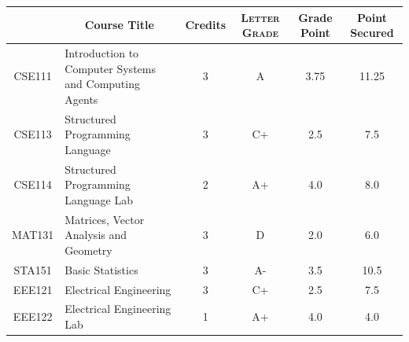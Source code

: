 \documentclass[11pt]{article}
\newcommand*{\numtwo}[1]{\pgfmathprintnumber[
                    fixed, precision=2, fixed zerofill=true]{#1}}
\begin{document}
                \begin{center}
                    \renewcommand{\arraystretch}{1.08}
                    
                \begin{tabular}{|c|l|c|>{\scshape}c|c|c|}
                \hline  \rule[-1ex]{0pt}{3.5ex} {\centering{\bf Course Code}} &  \multicolumn{1}{c|}{\textbf{Course Title}}  & {\bf Credits} & {\bf Letter Grade} & {\bf Grade Point} & {\bf Point Secured}  \\ 
                \hline   CSE111 &  Introduction to Computer Systems and Computing Agents		 & 3 & A & 3.75 & 11.25 \\ %
                \hline   CSE113 &  Structured Programming Language		 & 3 & C+ & 2.5 & 7.5 \\ %
                \hline   CSE114 &  Structured Programming Language Lab		 & 2 & A+ & 4.0 & 8.0 \\ %
                \hline   MAT131 &  Matrices, Vector Analysis and Geometry		 & 3 & D & 2.0 & 6.0 \\ %
                \hline   STA151 &  Basic Statistics		 & 3 & A- & 3.5 & 10.5 \\ %
                \hline   EEE121 &  Electrical Engineering		 & 3 & C+ & 2.5 & 7.5 \\ %
                \hline   EEE122 &  Electrical Engineering Lab		 & 1 & A+ & 4.0 & 4.0 \\ %

\hline                %
                \end{tabular}
                \end{center}
                \renewcommand{\arraystretch}{1.03}
\end{document}
